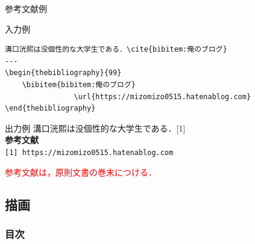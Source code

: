 \documentclass[dvipdfmx]{beamer}
\begin{document}
\begin{frame}[fragile]{参考文献例}
    \begin{exampleblock}{入力例}
        \begin{verbatim}
溝口洸熙は没個性的な大学生である．\cite{bibitem:俺のブログ}
---
\begin{thebibliography}{99}
    \bibitem{bibitem:俺のブログ} 
                \url{https://mizomizo0515.hatenablog.com}
\end{thebibliography}
        \end{verbatim}
    \end{exampleblock}
    \begin{exampleblock}{出力例}
        溝口洸熙は没個性的な大学生である．[1]\\
        \textbf{参考文献}\\
        \verb|[1] https://mizomizo0515.hatenablog.com|
    \end{exampleblock}
    \textcolor{red}{参考文献は，原則文書の巻末につける．}
\end{frame}


\subsection{描画}
\begin{frame}
    \frametitle{目次}
    \tableofcontents[currentsection,sectionstyle=show/shaded,subsectionstyle=show/shaded]
\end{frame}
\end{document}
